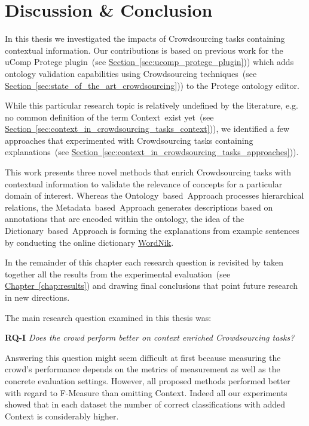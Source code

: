 \chapter{Discussion \& Conclusion}\label{chap:discussion_and_conclusion}
In this thesis we investigated the impacts of Crowdsourcing tasks containing contextual information. Our contributions
is based on previous work for the uComp Protege plugin~(see \hyperref[sec:ucomp_protege_plugin]{Section~\ref*{sec:ucomp_protege_plugin}})) which adds ontology validation capabilities using Crowdsourcing techniques~(see \hyperref[sec:state_of_the_art_crowdsourcing]{Section~\ref*{sec:state_of_the_art_crowdsourcing}})) to the Protege ontology editor.  

While this particular research topic is relatively undefined by the literature, e.g. no common definition of the term \guillemotright Context\guillemotleft~exist yet~(see \hyperref[sec:context_in_crowdsourcing_tasks_context]{Section~\ref*{sec:context_in_crowdsourcing_tasks_context}})),
we identified a few approaches that experimented with Crowdsourcing tasks containing explanations~(see \hyperref[sec:context_in_crowdsourcing_tasks_approaches]{Section~\ref*{sec:context_in_crowdsourcing_tasks_approaches}})). 

This work presents three novel methods that enrich Crowdsourcing tasks with contextual information to validate the relevance of concepts for a particular domain of interest. Whereas the Ontology~based~Approach processes hierarchical relations, the Metadata~based~Approach generates descriptions based on annotations that are encoded within the ontology, the idea of the Dictionary~based~Approach is forming the explanations from example sentences by conducting the online dictionary \hyperref[sec:wordnik]{WordNik}.

In the remainder of this chapter each research question is revisited by taken together all the results from the experimental evaluation~(see \hyperref[chap:results]{Chapter~\ref*{chap:results}}) and drawing final conclusions that point future research in new directions. 

The main research question examined in this thesis was:
 
\textbf{RQ-I} \emph{Does the crowd perform better on context enriched Crowdsourcing tasks?}

Answering this question might seem difficult at first because measuring the crowd's performance depends on the metrics of measurement as well as the concrete evaluation settings. However, all proposed methods performed better with regard to F-Measure than omitting Context. Indeed all our experiments showed that in each dataset the number of correct classifications with added Context is considerably higher. 

